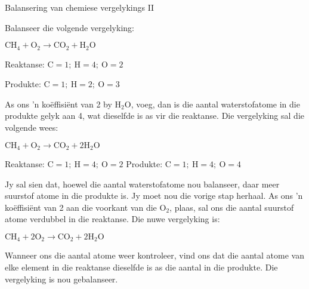 \begin{wex}{Balansering van chemiese vergelykings II}{Balanseer die volgende vergelyking:
\begin{center}
${\text{CH}_{4} + \text{O}_{2} \rightarrow \text{CO}_{2} + \text{H}_{2}\text{O}}$
\end{center}
}
{

Reaktanse: $\text{C} = 1;~ \text{H} = 4;~ \text{O} = 2$

Produkte: $\text{C} = 1;~ \text{H} = 2;~ \text{O} = 3$


As ons 'n koëffisiënt van 2 by $\text{H}_{2}\text{O}$, voeg, dan is die aantal waterstofatome in die produkte gelyk aan  4, wat   dieselfde is  as vir die reaktanse. Die vergelyking sal die volgende wees:

\begin{center}
${\text{CH}_{4} + \text{O}_{2} \rightarrow \text{CO}_{2} + 2\text{H}_{2}\text{O}}$\\
\end{center}


Reaktanse: $\text{C} = 1;~ \text{H} = 4;~ \text{O} = 2$
Produkte: $\text{C} = 1;~ \text{H} = 4; ~\text{O} = 4$

Jy sal sien dat, hoewel die aantal waterstofatome nou balanseer, daar meer suurstof atome in die produkte is. Jy moet nou die vorige stap herhaal. As ons 'n koëffisiënt van 2 aan die voorkant van die $\text{O}_{2}$, plaas, sal ons die aantal suurstof atome verdubbel in die reaktanse. Die nuwe vergelyking is:
\begin{center}
${\text{CH}_{4} + 2\text{O}_{2} \rightarrow \text{CO}_{2} + 2\text{H}_{2}\text{O}}$
\end{center}
Wanneer ons die aantal atome weer kontroleer, vind ons dat die aantal atome van elke element in die reaktanse dieselfde is as die aantal in die produkte. Die vergelyking is nou gebalanseer.
}
\end{wex}
    \noindent
\label{m38726*secfhsst!!!underscore!!!id501}
      \noindent
\par
            \label{m38726*secfhsst!!!underscore!!!id590} 
      \noindent
